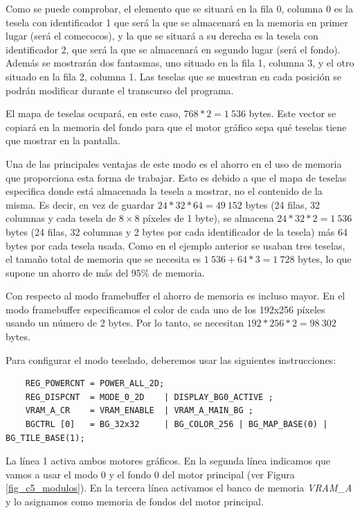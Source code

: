	
Como se puede comprobar, el elemento que se situará en la fila 0, columna 0 es la tesela con identificador 1 que será la que se almacenará en la memoria en primer lugar (será el comecocos), y la que se situará a su derecha es la tesela con identificador 2, que será la que se almacenará en segundo lugar (será el fondo). Además se mostrarán dos fantasmas, uno situado en la fila 1, columna 3, y el otro situado en la fila 2, columna 1. Las teselas que se muestran en cada posición se podrán modificar durante el transcurso del programa.

El mapa de teselas ocupará, en este caso, $768*2=1\ 536$ bytes. Este vector se copiará en la memoria del fondo para que el motor gráfico sepa qué teselas tiene que mostrar en la pantalla.

Una de las principales ventajas de este modo es el ahorro en el uso de memoria que proporciona esta forma de trabajar. Esto es debido a que el mapa de teselas especifica donde está almacenada la tesela a mostrar, no el contenido de la misma. Es decir, en vez de guardar $24*32*64 = 49\ 152$ bytes (24 filas, 32 columnas y cada tesela de $8\times8$ píxeles de 1 byte), se almacena $24*32*2 = 1\ 536$ bytes (24 filas, 32 columnas y 2 bytes por cada identificador de la tesela) más 64 bytes por cada tesela usada. Como en el ejemplo anterior se usaban tres teselas, el tamaño total de memoria que se necesita es $1\ 536 + 64*3 = 1\ 728$ bytes, lo que supone un ahorro de más del 95\% de memoria.

Con respecto al modo framebuffer el ahorro de memoria es incluso mayor. En el modo framebuffer especificamos el color de cada uno de los 192x256 píxeles usando un número de 2 bytes. Por lo tanto, se necesitan $192*256*2=98\ 302$ bytes. 

Para configurar el modo teselado, deberemos usar las siguientes instrucciones:

\begin{lstlisting}
	REG_POWERCNT = POWER_ALL_2D;
	REG_DISPCNT  = MODE_0_2D    | DISPLAY_BG0_ACTIVE ;
	VRAM_A_CR    = VRAM_ENABLE  | VRAM_A_MAIN_BG ;
	BGCTRL [0]   = BG_32x32     | BG_COLOR_256 | BG_MAP_BASE(0) | BG_TILE_BASE(1);
\end{lstlisting}

La línea 1 activa ambos motores gráficos. En la segunda línea indicamos que vamos a usar el modo 0 y el fondo 0 del motor principal (ver Figura \ref{fig_c5_modulos}). En la tercera línea activamos el banco de memoria \textit{VRAM\_A} y lo asignamos como memoria de fondos del motor principal. 

